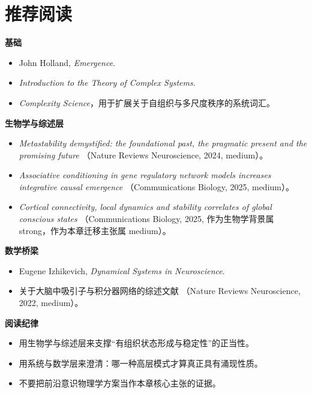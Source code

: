\section{推荐阅读}

\begin{readingbox}
\textbf{基础}
\begin{itemize}[nosep]
  \item John Holland, \emph{Emergence}.
  \item \emph{Introduction to the Theory of Complex Systems}.
  \item \emph{Complexity Science}，用于扩展关于自组织与多尺度秩序的系统词汇。
\end{itemize}
\textbf{生物学与综述层}
\begin{itemize}[nosep]
  \item \emph{Metastability demystified: the foundational past, the pragmatic
        present and the promising future} （Nature Reviews Neuroscience, 2024,
        medium）。
  \item \emph{Associative conditioning in gene regulatory network models
        increases integrative causal emergence} （Communications Biology, 2025,
        medium）。
  \item \emph{Cortical connectivity, local dynamics and stability correlates of
        global conscious states} （Communications Biology, 2025, 作为生物学背景属 strong，作为本章迁移主张属 medium）。
\end{itemize}
\textbf{数学桥梁}
\begin{itemize}[nosep]
  \item Eugene Izhikevich, \emph{Dynamical Systems in Neuroscience}.
  \item 关于大脑中吸引子与积分器网络的综述文献
        （Nature Reviews Neuroscience, 2022, medium）。
\end{itemize}
\textbf{阅读纪律}
\begin{itemize}[nosep]
  \item 用生物学与综述层来支撑“有组织状态形成与稳定性”的正当性。
  \item 用系统与数学层来澄清：哪一种高层模式才算真正具有涌现性质。
  \item 不要把前沿意识物理学方案当作本章核心主张的证据。
\end{itemize}
\end{readingbox}